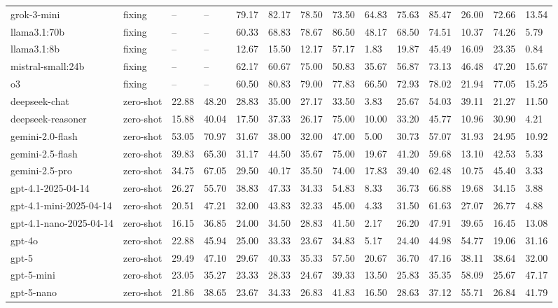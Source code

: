 \begin{table}[!t]
\begin{tabular}{llllllllllllll}
grok-3-mini & fixing & -- & -- & 79.17 & 82.17 & 78.50 & 73.50 & 64.83 & 75.63 & 85.47 & 26.00 & 72.66 & 13.54 \\
llama3.1:70b & fixing & -- & -- & 60.33 & 68.83 & 78.67 & 86.50 & 48.17 & 68.50 & 74.51 & 10.37 & 74.26 & 5.79 \\
llama3.1:8b & fixing & -- & -- & 12.67 & 15.50 & 12.17 & 57.17 & 1.83 & 19.87 & 45.49 & 16.09 & 23.35 & 0.84 \\
mistral-small:24b & fixing & -- & -- & 62.17 & 60.67 & 75.00 & 50.83 & 35.67 & 56.87 & 73.13 & 46.48 & 47.20 & 15.67 \\
o3 & fixing & -- & -- & 60.50 & 80.83 & 79.00 & 77.83 & 66.50 & 72.93 & 78.02 & 21.94 & 77.05 & 15.25 \\
deepseek-chat & zero-shot & 22.88 & 48.20 & 28.83 & 35.00 & 27.17 & 33.50 & 3.83 & 25.67 & 54.03 & 39.11 & 21.27 & 11.50 \\
deepseek-reasoner & zero-shot & 15.88 & 40.04 & 17.50 & 37.33 & 26.17 & 75.00 & 10.00 & 33.20 & 45.77 & 10.96 & 30.90 & 4.21 \\
gemini-2.0-flash & zero-shot & 53.05 & 70.97 & 31.67 & 38.00 & 32.00 & 47.00 & 5.00 & 30.73 & 57.07 & 31.93 & 24.95 & 10.92 \\
gemini-2.5-flash & zero-shot & 39.83 & 65.30 & 31.17 & 44.50 & 35.67 & 75.00 & 19.67 & 41.20 & 59.68 & 13.10 & 42.53 & 5.33 \\
gemini-2.5-pro & zero-shot & 34.75 & 67.05 & 29.50 & 40.17 & 35.50 & 74.00 & 17.83 & 39.40 & 62.48 & 10.75 & 45.40 & 3.33 \\
gpt-4.1-2025-04-14 & zero-shot & 26.27 & 55.70 & 38.83 & 47.33 & 34.33 & 54.83 & 8.33 & 36.73 & 66.88 & 19.68 & 34.15 & 3.88 \\
gpt-4.1-mini-2025-04-14 & zero-shot & 20.51 & 47.21 & 32.00 & 43.83 & 32.33 & 45.00 & 4.33 & 31.50 & 61.63 & 27.07 & 26.77 & 4.88 \\
gpt-4.1-nano-2025-04-14 & zero-shot & 16.15 & 36.85 & 24.00 & 34.50 & 28.83 & 41.50 & 2.17 & 26.20 & 47.91 & 39.65 & 16.45 & 13.08 \\
gpt-4o & zero-shot & 22.88 & 45.94 & 25.00 & 33.33 & 23.67 & 34.83 & 5.17 & 24.40 & 44.98 & 54.77 & 19.06 & 31.16 \\
gpt-5 & zero-shot & 29.49 & 47.10 & 29.67 & 40.33 & 35.33 & 57.50 & 20.67 & 36.70 & 47.16 & 38.11 & 38.64 & 32.00 \\
gpt-5-mini & zero-shot & 23.05 & 35.27 & 23.33 & 28.33 & 24.67 & 39.33 & 13.50 & 25.83 & 35.35 & 58.09 & 25.67 & 47.17 \\
gpt-5-nano & zero-shot & 21.86 & 38.65 & 23.67 & 34.33 & 26.83 & 41.83 & 16.50 & 28.63 & 37.12 & 55.71 & 26.84 & 41.79 \\

\end{tabular}
\end{table}
